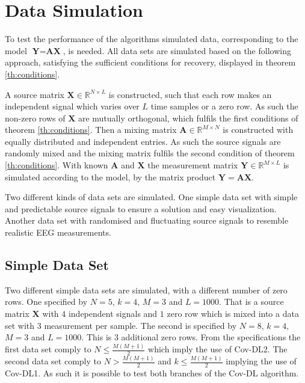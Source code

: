 \section{Data Simulation}\label{sec:dataset}
To test the performance of the algorithms simulated data, corresponding to the model $\textbf{Y}=\textbf{A}\textbf{X}$, is needed. All data sets are simulated based on the following approach, satisfying the sufficient conditions for recovery, displayed in theorem \ref{th:conditions}.
 
A source matrix $\mathbf{X} \in \mathbb{R}^{N \times L}$ is constructed, such that each row makes an independent signal which varies over $L$ time samples or a zero row. As such the non-zero rows of $\mathbf{X}$ are mutually orthogonal, which fulfils the first conditions of theorem \ref{th:conditions}.   
Then a mixing matrix $\mathbf{A} \in \mathbb{R}^{M \times N}$ is constructed with equally distributed and independent entries. As such the source signals are randomly mixed and the mixing matrix fulfils the second condition of theorem \ref{th:conditions}.
With known $\mathbf{A}$ and $\mathbf{X}$ the measurement matrix $\mathbf{Y} \in \mathbb{R}^{M \times L}$ is simulated according to the model, by the matrix product $\mathbf{Y} = \mathbf{AX}$.  

Two different kinds of data sets are simulated.
One simple data set with simple and predictable source signals to ensure a solution and easy visualization.
Another data set with randomised and fluctuating source signals to resemble realistic EEG measurements.

\subsection{Simple Data Set}\label{subseg_simpledata}
Two different simple data sets are simulated, with a different number of zero rows. 
One specified by $N = 5$, $k = 4$, $M = 3$ and $L = 1000$. That is a source matrix $\mathbf{X}$ with $4$ independent signals and $1$ zero row which is mixed into a data set with $3$ measurement per sample.  
The second is specified by $N = 8$, $k = 4$, $M = 3$ and $L = 1000$. This is 3 additional zero rows.
From the specifications the first data set comply to $N \leq \frac{M(M+1)}{2}$ which imply the use of Cov-DL2.
The second data set comply to $N > \frac{M(M+1)}{2}$ and $k \leq \frac{M(M+1)}{2}$ implying the use of Cov-DL1. As such it is possible to test both branches of the Cov-DL algorithm. 
     

